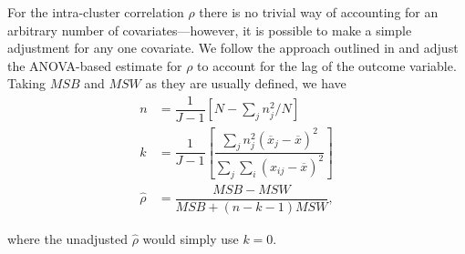 \documentclass{article}
\begin{document}
For the intra-cluster correlation $\rho$ there is no trivial way of accounting for an arbitrary number of covariates---however, it is possible to make a simple adjustment for any one covariate. We follow the approach outlined in \citet{stanish_estimation_1983} and adjust the ANOVA-based estimate for $\rho$ to account for the lag of the outcome variable. Taking $MSB$ and $MSW$ as they are usually defined, we have
\begin{align*}
  n & = \dfrac{1}{J - 1} \left[N - \sum^{}_{j} n_j^2 / N \right] \\
  k & = \dfrac{1}{J - 1} \left[\dfrac{\sum^{}_{j} n_j^2 (\overline{x}_j - \overline{x})^2}{\sum^{}_{j} \sum^{}_{i} (x_{ij} - \overline{x})^2}\right] \\
  \widehat{\rho} & = \dfrac{MSB - MSW}{MSB + (n - k - 1) MSW},
\end{align*}

where the unadjusted $\widehat{\rho}$ would simply use $k = 0$.





\end{document}
